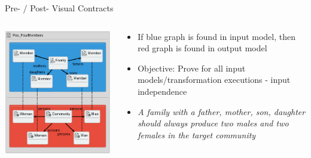 \documentclass[xcolor=dvipsnames, 12pt, handout]{beamer}
\begin{document}
\begin{frame}{Pre- / Post- Visual Contracts}
\begin{columns}[T] %
     \begin{column}[T]{0.45\textwidth} %
     \includegraphics[width=\textwidth]{figures/Pos_FourMembers}
     \end{column}
     \begin{column}[T]{0.55\textwidth}
     \begin{itemize}[<+->]
     \item If blue graph is found in input model, then red graph is found in output model
     \item Objective: Prove for all input models/transformation executions - input independence
     \item \textit{A family with a father, mother, son, daughter
     should always produce two males and two females in the
     target community}
     \end{itemize}
     \end{column}
     \end{columns}

\end{frame}
\end{document}
